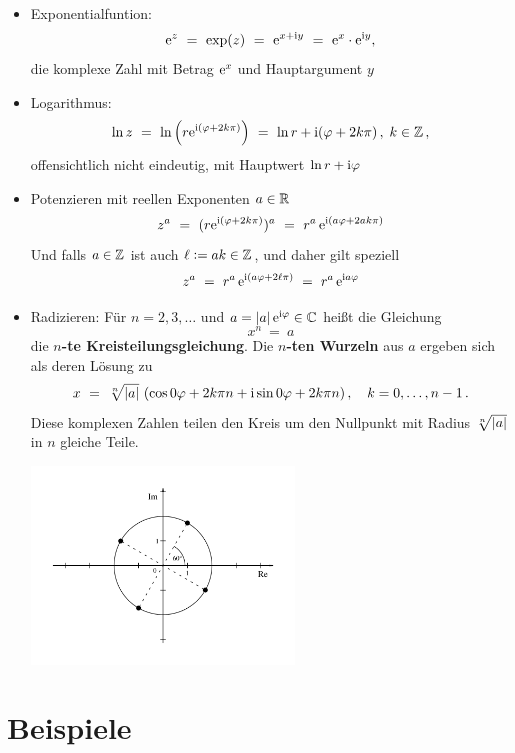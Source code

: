 \begin{itemize}
\addtolength{\itemsep}{-1em}
\item{}Exponentialfuntion:
\[
\mathrm{e}^{z}
\ =\ \exp(z)
\ =\ \mathrm{e}^{x+\mathrm{i} y}
\ =\ \mathrm{e}^x\cdot\mathrm{e}^{\mathrm{i} y}
,
\]
die komplexe Zahl mit Betrag $\mathrm{e}^x$ und Hauptargument $y$

\item{}Logarithmus:
\[
\ln z
\ =\ \ln\left(r\mathrm{e}^{\mathrm{i}(\varphi+2k\pi)}\right)
\ =\ \ln r + \mathrm{i}(\varphi+2k\pi)
\,,\;k\in\mathbb{Z}
\,,
\]
offensichtlich nicht eindeutig, mit Hauptwert $\ln r + \mathrm{i}\varphi$

\item{}Potenzieren mit reellen Exponenten $a\in\mathbb{R}$
\[
z^a
\ =\ (r\mathrm{e}^{\mathrm{i}(\varphi+2k\pi)})^a
\ =\ r^a\,\mathrm{e}^{\mathrm{i}(a\varphi+2ak\pi)}
\]
Und falls $a\in\mathbb{Z}$ ist auch $\ell\mathrel{\mathop:}={}ak\in\mathbb{Z}$, und daher gilt speziell
\[
z^a
\ =\ r^a\,\mathrm{e}^{\mathrm{i}(a\varphi+2\ell\pi)}
\ =\ r^a\,\mathrm{e}^{\mathrm{i} a\varphi}
\]

\item{}Radizieren:
Für $n=2,3,\dotsc$ und $a=\lvert a\rvert\,\mathrm{e}^{\mathrm{i}\varphi}\in\mathbb{C}$ heißt die
Gleichung
\[
x^n
\ =\ a
\]
die \textbf{\boldmath$n$-te Kreisteilungsgleichung}. Die \textbf{\boldmath$n$-ten Wurzeln} aus $a$ ergeben sich als deren Lösung zu
\[
x
\ =\ \sqrt[n]{\abs{a}}\,\left(
\cos\frac{\varphi+2k\pi}{n}
+\imag\sin\frac{\varphi+2k\pi}{n}
\right)
,\quad{}
k=0,\dotsc,n-1\,.
\]
Diese komplexen Zahlen teilen den Kreis um den Nullpunkt mit Radius $\sqrt[n]{\lvert a\rvert}$ in $n$ gleiche Teile.

\centerline{\includegraphics[width=7cm]{img/complex3}}
\end{itemize}

\section{Beispiele}


